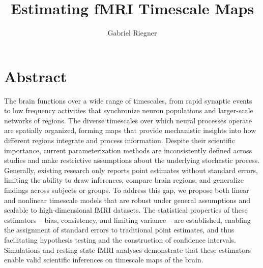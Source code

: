 \documentclass[9pt]{article}
\title{Estimating fMRI Timescale Maps}
\author{Gabriel Riegner}
\begin{document}
\maketitle

\section{Abstract}
The brain functions over a wide range of timescales, from rapid synaptic events to low frequency activities that synchronize neuron populations and larger-scale networks of regions. The diverse timescales over which neural processes operate are spatially organized, forming maps that provide mechanistic insights into how different regions integrate and process information. Despite their scientific importance, current parameterization methods are inconsistently defined across studies and make restrictive assumptions about the underlying stochastic process. Generally, existing research only reports point estimates without standard errors,  limiting the ability to draw inferences, compare brain regions, and generalize findings across subjects or groups. To address this gap, we propose both linear and nonlinear timescale models that are robust under general assumptions and scalable to high-dimensional fMRI datasets. The statistical properties of these estimators -- bias, consistency, and limiting variance -- are established, enabling the assignment of standard errors to traditional point estimates, and thus facilitating hypothesis testing and the construction of confidence intervals. Simulations and resting-state fMRI analyses demonstrate that these estimators enable valid scientific inferences on timescale maps of the brain.







\printbibliography
\end{document}
